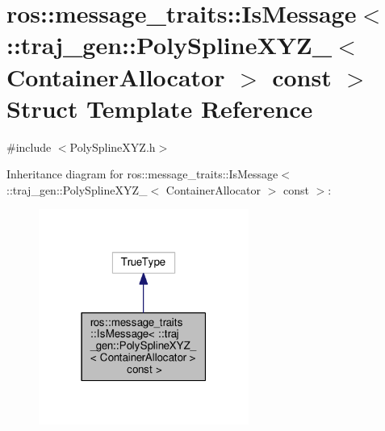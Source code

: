 \hypertarget{structros_1_1message__traits_1_1_is_message_3_01_1_1traj__gen_1_1_poly_spline_x_y_z___3_01_conta3ba5a22bb4e2f5978290338256f05796}{}\section{ros\+:\+:message\+\_\+traits\+:\+:Is\+Message$<$ \+:\+:traj\+\_\+gen\+:\+:Poly\+Spline\+X\+Y\+Z\+\_\+$<$ Container\+Allocator $>$ const $>$ Struct Template Reference}
\label{structros_1_1message__traits_1_1_is_message_3_01_1_1traj__gen_1_1_poly_spline_x_y_z___3_01_conta3ba5a22bb4e2f5978290338256f05796}


{\ttfamily \#include $<$Poly\+Spline\+X\+Y\+Z.\+h$>$}



Inheritance diagram for ros\+:\+:message\+\_\+traits\+:\+:Is\+Message$<$ \+:\+:traj\+\_\+gen\+:\+:Poly\+Spline\+X\+Y\+Z\+\_\+$<$ Container\+Allocator $>$ const $>$\+:
\nopagebreak
\begin{figure}[H]
\begin{center}
\leavevmode
\includegraphics[width=195pt]{structros_1_1message__traits_1_1_is_message_3_01_1_1traj__gen_1_1_poly_spline_x_y_z___3_01_contafae0a74c0495d997c8d2c90fc76348e7}
\end{center}
\end{figure}



